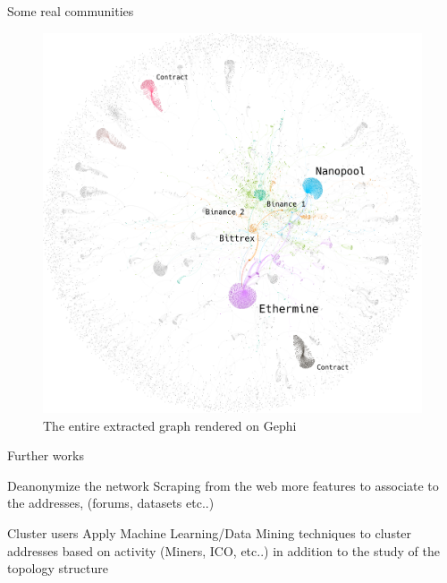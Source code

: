 \documentclass{beamer}
\begin{document}
    \begin{frame}{}
        \begin{block}{Some real communities}
            \begin{figure}
                \includegraphics[scale=0.125]{gephi_3.png}
                \caption{The entire extracted graph rendered on Gephi}\label{fig:gephi_1}
            \end{figure}
        \end{block}
    \end{frame}

    \begin{frame}{Further works}
        \begin{block}{Deanonymize the network}
            Scraping from the web more features to associate to the addresses, (forums, datasets etc..)
        \end{block}

        \vskip 1cm

        \begin{block}{Cluster users}
            Apply Machine Learning/Data Mining techniques to cluster addresses based on activity (Miners, ICO, etc..) in addition to the study of the topology structure
        \end{block}
    \end{frame}
\end{document}
